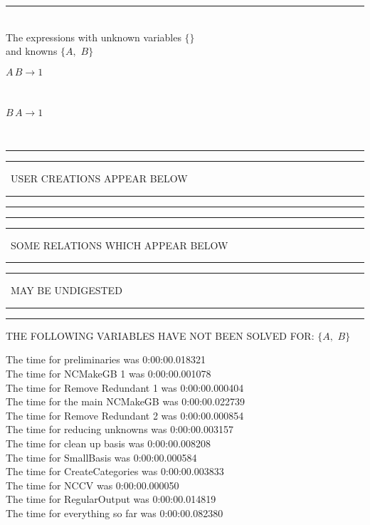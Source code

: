 \documentclass[rep10,leqno]{report}
\begin{document}
\rule[3pt]{6in}{.7pt}\\
The expressions with unknown variables $\{\}$\\
and knowns $\{A,
$ $
B\}$\smallskip\\
\begin{minipage}{6in}
$
A\,
 B\rightarrow 1
$
\end{minipage}\medskip \\
\begin{minipage}{6in}
$
B\,
 A\rightarrow 1
$
\end{minipage}\\
\rule[2pt]{6in}{1pt}\hfil\break
\rule[2.5pt]{1.701in}{1pt}
\ USER CREATIONS APPEAR BELOW\ 
\rule[2.5pt]{1.701in}{1pt}\hfil\break
\rule[2pt]{6in}{1pt}\hfil\break
\rule[2pt]{6in}{4pt}\hfil\break
\rule[2pt]{1.45in}{4pt}
\ SOME RELATIONS WHICH APPEAR BELOW\ 
\rule[2pt]{1.45in}{4pt}\hfil\break
\rule[2pt]{2.18in}{4pt}
\ MAY BE UNDIGESTED\ 
\rule[2pt]{2.18in}{4pt}\hfil\break
\rule[2pt]{6in}{4pt}\hfil\break
THE FOLLOWING VARIABLES HAVE NOT BEEN SOLVED FOR:\hfil\break
$\{A,
$ $
B\}$
\smallskip\\
\vspace{10pt}

\noindent
The time for preliminaries was 0:00:00.018321\\
The time for NCMakeGB 1 was 0:00:00.001078\\
The time for Remove Redundant 1 was 0:00:00.000404\\
The time for the main NCMakeGB was 0:00:00.022739\\
The time for Remove Redundant 2 was 0:00:00.000854\\
The time for reducing unknowns was 0:00:00.003157\\
The time for clean up basis was 0:00:00.008208\\
The time for SmallBasis was 0:00:00.000584\\
The time for CreateCategories was 0:00:00.003833\\
The time for NCCV was 0:00:00.000050\\
The time for RegularOutput was 0:00:00.014819\\
The time for everything so far was 0:00:00.082380\\
\end{document}
